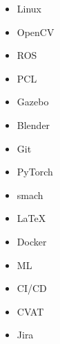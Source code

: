 \documentclass[
	a4paper,
	maincolor=cvblue,
	sectioncolor=cvblue,
	profilepicborderwidth=3.0pt,
]{fortysecondscv}
\begin{document}
\vspace{-0.3cm}
\begin{multicols}{5}
\begin{itemize}
  \item Linux
  \item OpenCV
  \item ROS
  \item PCL
  \item Gazebo
  \item Blender
  \item Git
  \item PyTorch
  \item smach
  \item \LaTeX
  \item Docker
  \item ML
  \item CI/CD
  \item CVAT
  \item Jira
\end{itemize}
\end{multicols}



\end{document}
